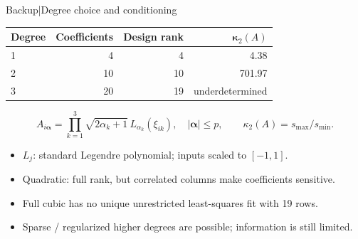\begin{frame}{Backup\enspace|\enspace Degree choice and conditioning}
  \small
  \begin{center}
  \renewcommand{\arraystretch}{1.35}
  \begin{tabular}{lrrr}
    \toprule
    \textbf{Degree} & \textbf{Coefficients} & \textbf{Design rank} & $\boldsymbol\kappa_2(A)$\\
    \midrule
    1 & 4 & 4 & 4.38\\
    2 & 10 & 10 & 701.97\\
    3 & 20 & 19 & underdetermined\\
    \bottomrule
  \end{tabular}
  \end{center}
  \[
    A_{i\boldsymbol\alpha}=\prod_{k=1}^3\sqrt{2\alpha_k+1}\,
    L_{\alpha_k}(\xi_{ik}),\quad |\boldsymbol\alpha|\leq p,
    \qquad \kappa_2(A)=s_{\max}/s_{\min}.
  \]
  \begin{itemize}
    \item $L_j$: standard Legendre polynomial; inputs scaled to $[-1,1]$.
    \item Quadratic: full rank, but correlated columns make coefficients sensitive.
    \item Full cubic has no unique unrestricted least-squares fit with 19 rows.
    \item Sparse / regularized higher degrees are possible; information is still limited.
  \end{itemize}
\end{frame}


